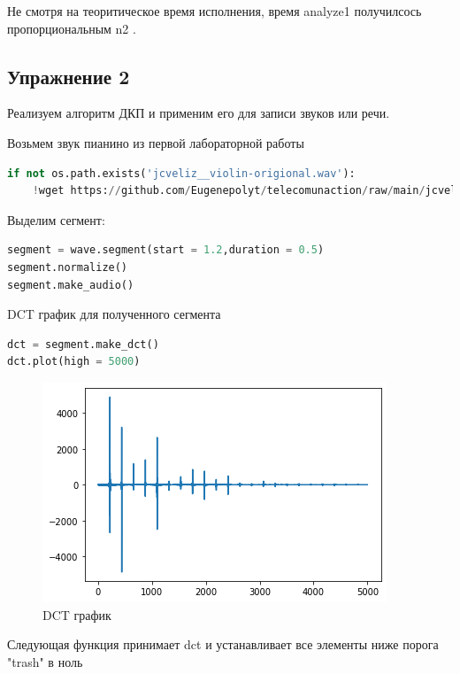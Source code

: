 Не смотря на теоритическое время исполнения, время analyze1 получилсось пропорциональным  n2 .

\subsection{Упражнение 2}

Реализуем алгоритм ДКП и применим его для записи звуков или речи.

Возьмем звук пианино из первой лабораторной работы

\begin{lstlisting}[language=Python]
if not os.path.exists('jcveliz__violin-origional.wav'):
    !wget https://github.com/Eugenepolyt/telecomunaction/raw/main/jcveliz__violin-origional.wav
\end{lstlisting}

Выделим сегмент:

\begin{lstlisting}[language=Python]
segment = wave.segment(start = 1.2,duration = 0.5)
segment.normalize()
segment.make_audio()
\end{lstlisting}

DCT график для полученного сегмента

\begin{lstlisting}[language=Python]
dct = segment.make_dct()
dct.plot(high = 5000)
\end{lstlisting}


\begin{figure}[H]
	\begin{center}
		\includegraphics[scale=1]{fig/lab06/lab06_2.png}
		\caption{DCT график}
	\end{center}
\end{figure}

Следующая функция принимает dct и устанавливает все элементы ниже порога "trash" в ноль

